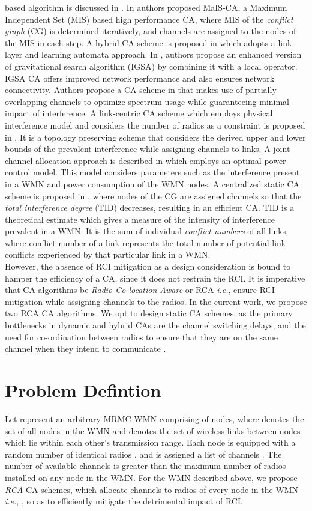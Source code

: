 \documentclass[conference]{IEEEtran}
\begin{document}
based algorithm is discussed in \cite{17Xutao}. In \cite{24Aizaz} authors proposed MaIS-CA, a Maximum Independent Set (MIS) based high performance CA, where MIS of the \textit{conflict graph} (CG) is determined iteratively, and channels are assigned to the nodes of the MIS in each step. A hybrid CA scheme is proposed in \cite{LLLA} which adopts a link-layer and learning automata approach. In \cite{Gravity}, authors propose an enhanced version of gravitational search algorithm (IGSA) by combining it with a local operator. IGSA CA offers improved network performance and also ensures network connectivity. Authors propose a CA scheme in \cite{Part} that makes use of partially overlapping channels to optimize spectrum usage while guaranteeing minimal impact of interference. A link-centric CA scheme which employs physical interference model and considers the number of radios as a constraint is proposed in \cite{Linkc}. It is a topology preserving scheme that considers the  derived upper and lower bounds of the 
prevalent interference while assigning channels to links. A joint channel allocation approach is described in \cite{Joint} which employs an optimal power control model. This model considers parameters such as the interference present in a WMN and power consumption of the WMN nodes. A centralized static CA scheme is proposed in \cite{23Cheng}, where nodes of the CG are assigned channels so that the \textit{total interference degree} (TID) decreases, resulting in an efficient CA. TID is a theoretical estimate which gives a measure of the intensity of interference prevalent in a WMN. It is the sum of individual \textit{conflict numbers} of all links, where conflict number of a link represents the total number of potential link conflicts experienced by that particular link in a WMN.\\
However, the absence of RCI mitigation as a design consideration is bound to hamper the efficiency of a CA, since it does not restrain the RCI. It is imperative that CA algorithms be \textit{Radio Co-location Aware} or RCA \emph{i.e.}, ensure RCI mitigation while assigning channels to the radios. In the current work, we propose two RCA CA algorithms. We opt to design static CA schemes, as the primary bottlenecks in dynamic and hybrid CAs are the channel switching delays, and the need for co-ordination between radios to ensure that they are on the same channel when they intend to communicate \cite{8Raniwala}.

\section{Problem Defintion}
Let  represent an arbitrary MRMC WMN comprising of  nodes, where  denotes the set of all nodes in the WMN and  denotes the set of wireless links between nodes which lie within each other's transmission range. Each node  is equipped with a random number of identical radios , and is assigned a list of channels . The number of available channels is greater than the maximum number of radios installed on any node in the WMN. For the WMN described above, we propose \textit{RCA} CA schemes, which allocate channels to radios of every node  in the WMN \emph{i.e.}, , so as to efficiently mitigate the detrimental impact of RCI. 
\end{document}
